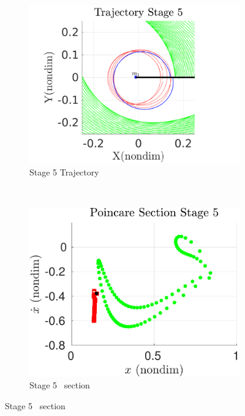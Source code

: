 \begin{figure}[htbp]
    \centering
    \begin{subfigure}[htbp]{0.5\textwidth} 
        \includegraphics[width=\textwidth, keepaspectratio]{figures/2017_JAS/stage5_trajectory_zoom.pdf} 
        \caption{Stage 5 Trajectory~\label{fig:stage5_trajecotry_zoom}} 
    \end{subfigure}~
    \begin{subfigure}[htbp]{0.5\textwidth} 
        \includegraphics[width=\textwidth, keepaspectratio]{figures/2017_JAS/stage5_poincare.pdf} 
        \caption{Stage 5 \Poincare~section \label{fig:stage5_poincare}} 
    \end{subfigure}


\end{figure}
